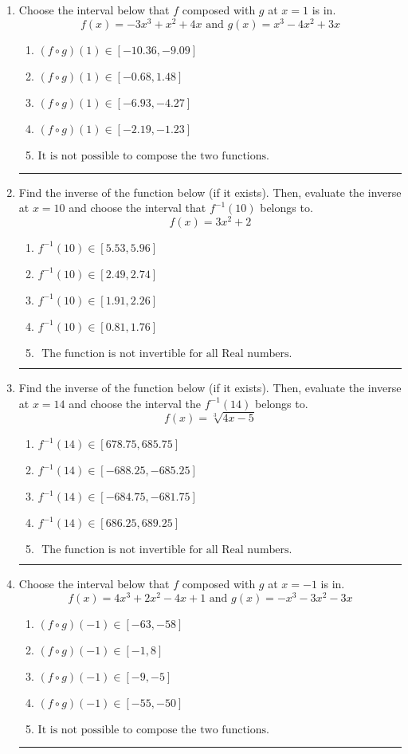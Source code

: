 \documentclass[14pt]{extbook}
\newcommand{\litem}[1]{\item#1\hspace*{-1cm}\rule{\textwidth}{0.4pt}}
\begin{document}
\begin{enumerate}
\litem{
Choose the interval below that $f$ composed with $g$ at $x=1$ is in.\[ f(x) = -3x^{3} + x^{2} +4 x \text{ and } g(x) = x^{3} -4 x^{2} +3 x \]\begin{enumerate}[label=\Alph*.]
\item \( (f \circ g)(1) \in [-10.36, -9.09] \)
\item \( (f \circ g)(1) \in [-0.68, 1.48] \)
\item \( (f \circ g)(1) \in [-6.93, -4.27] \)
\item \( (f \circ g)(1) \in [-2.19, -1.23] \)
\item \( \text{It is not possible to compose the two functions.} \)

\end{enumerate} }
\litem{
Find the inverse of the function below (if it exists). Then, evaluate the inverse at $x = 10$ and choose the interval that $f^{-1}(10)$ belongs to.\[ f(x) = 3 x^2 + 2 \]\begin{enumerate}[label=\Alph*.]
\item \( f^{-1}(10) \in [5.53, 5.96] \)
\item \( f^{-1}(10) \in [2.49, 2.74] \)
\item \( f^{-1}(10) \in [1.91, 2.26] \)
\item \( f^{-1}(10) \in [0.81, 1.76] \)
\item \( \text{ The function is not invertible for all Real numbers. } \)

\end{enumerate} }
\litem{
Find the inverse of the function below (if it exists). Then, evaluate the inverse at $x = 14$ and choose the interval the $f^{-1}(14)$ belongs to.\[ f(x) = \sqrt[3]{4 x - 5} \]\begin{enumerate}[label=\Alph*.]
\item \( f^{-1}(14) \in [678.75, 685.75] \)
\item \( f^{-1}(14) \in [-688.25, -685.25] \)
\item \( f^{-1}(14) \in [-684.75, -681.75] \)
\item \( f^{-1}(14) \in [686.25, 689.25] \)
\item \( \text{ The function is not invertible for all Real numbers. } \)

\end{enumerate} }
\litem{
Choose the interval below that $f$ composed with $g$ at $x=-1$ is in.\[ f(x) = 4x^{3} +2 x^{2} -4 x + 1 \text{ and } g(x) = -x^{3} -3 x^{2} -3 x \]\begin{enumerate}[label=\Alph*.]
\item \( (f \circ g)(-1) \in [-63, -58] \)
\item \( (f \circ g)(-1) \in [-1, 8] \)
\item \( (f \circ g)(-1) \in [-9, -5] \)
\item \( (f \circ g)(-1) \in [-55, -50] \)
\item \( \text{It is not possible to compose the two functions.} \)


\end{enumerate}}
\end{enumerate}
\end{document}
